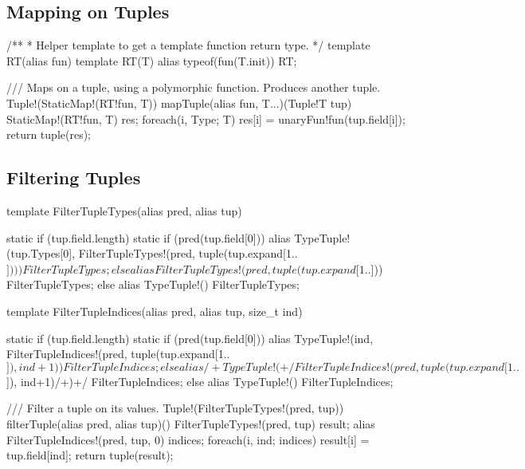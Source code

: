 
\subsection{Mapping on Tuples}\label{mappingontuples}

\begin{dcode}
/**
 * Helper template to get a template function return type.
 */
template RT(alias fun)
{
    template RT(T)
    {
        alias typeof(fun(T.init)) RT;
    }
}

/// Maps on a tuple, using a polymorphic function. Produces another tuple.
Tuple!(StaticMap!(RT!fun, T)) mapTuple(alias fun, T...)(Tuple!T tup)
{
    StaticMap!(RT!fun, T) res;
    foreach(i, Type; T) res[i] = unaryFun!fun(tup.field[i]);
    return tuple(res);
}
\end{dcode}


\subsection{Filtering Tuples}\label{filteringtuples}


\begin{dcode}
template FilterTupleTypes(alias pred, alias tup)
{
    static if (tup.field.length)
    {
        static if (pred(tup.field[0]))
            alias TypeTuple!(tup.Types[0], FilterTupleTypes!(pred, tuple(tup.expand[1..$]))) FilterTupleTypes;
        else
            alias FilterTupleTypes!(pred, tuple(tup.expand[1..$])) FilterTupleTypes;
    }
    else
    {
        alias TypeTuple!() FilterTupleTypes;
    }

}

template FilterTupleIndices(alias pred, alias tup, size_t ind)
{
    static if (tup.field.length)
    {
        static if (pred(tup.field[0]))
            alias TypeTuple!(ind, FilterTupleIndices!(pred, tuple(tup.expand[1..$]), ind+1)) FilterTupleIndices;
        else
            alias /+TypeTuple!(+/FilterTupleIndices!(pred, tuple(tup.expand[1..$]), ind+1)/+)+/ FilterTupleIndices;
    }
    else
    {
        alias TypeTuple!() FilterTupleIndices;
    }

}

/// Filter a tuple on its values.
Tuple!(FilterTupleTypes!(pred, tup)) filterTuple(alias pred, alias tup)()
{
    FilterTupleTypes!(pred, tup) result;
    alias FilterTupleIndices!(pred, tup, 0) indices;
    foreach(i, ind; indices)
    {
        result[i] = tup.field[ind];
    }
    return tuple(result);
}
\end{dcode}

